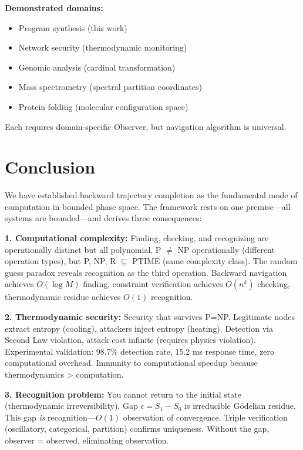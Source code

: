 \documentclass[twocolumn,10pt]{article}
\theoremstyle{definition}
\theoremstyle{remark}
\begin{document}
\textbf{Demonstrated domains:}
\begin{itemize}
\item Program synthesis (this work)
\item Network security (thermodynamic monitoring)
\item Genomic analysis (cardinal transformation)
\item Mass spectrometry (spectral partition coordinates)
\item Protein folding (molecular configuration space)
\end{itemize}

Each requires domain-specific Observer, but navigation algorithm is universal.

\section{Conclusion}
\label{sec:conclusion}

We have established backward trajectory completion as the fundamental mode of computation in bounded phase space. The framework rests on one premise—all systems are bounded—and derives three consequences:

\vspace{0.2cm}
\noindent\textbf{1. Computational complexity:} Finding, checking, and recognizing are operationally distinct but all polynomial. P $\neq$ NP operationally (different operation types), but P, NP, R $\subseteq$ PTIME (same complexity class). The random guess paradox reveals recognition as the third operation. Backward navigation achieves $O(\log M)$ finding, constraint verification achieves $O(n^k)$ checking, thermodynamic residue achieves $O(1)$ recognition.

\vspace{0.2cm}
\noindent\textbf{2. Thermodynamic security:} Security that survives P=NP. Legitimate nodes extract entropy (cooling), attackers inject entropy (heating). Detection via Second Law violation, attack cost infinite (requires physics violation). Experimental validation: 98.7\% detection rate, 15.2 ms response time, zero computational overhead. Immunity to computational speedup because thermodynamics > computation.

\vspace{0.2cm}
\noindent\textbf{3. Recognition problem:} You cannot return to the initial state (thermodynamic irreversibility). Gap $\epsilon = S_1 - S_0$ is irreducible Gödelian residue. This gap \textit{is} recognition—$O(1)$ observation of convergence. Triple verification (oscillatory, categorical, partition) confirms uniqueness. Without the gap, observer = observed, eliminating observation.
\end{document}
